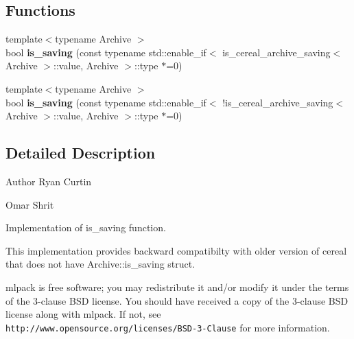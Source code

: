 \subsection*{Functions}
\begin{DoxyCompactItemize}
\item 
{\footnotesize template$<$typename Archive $>$ }\\bool \textbf{ is\+\_\+saving} (const typename std\+::enable\+\_\+if$<$ is\+\_\+cereal\+\_\+archive\+\_\+saving$<$ Archive $>$\+::value, Archive $>$\+::type $\ast$=0)
\item 
{\footnotesize template$<$typename Archive $>$ }\\bool \textbf{ is\+\_\+saving} (const typename std\+::enable\+\_\+if$<$ !is\+\_\+cereal\+\_\+archive\+\_\+saving$<$ Archive $>$\+::value, Archive $>$\+::type $\ast$=0)
\end{DoxyCompactItemize}


\subsection{Detailed Description}
\begin{DoxyAuthor}{Author}
Ryan Curtin 

Omar Shrit
\end{DoxyAuthor}
Implementation of is\+\_\+saving function.

This implementation provides backward compatibilty with older version of cereal that does not have Archive\+::is\+\_\+saving struct.

mlpack is free software; you may redistribute it and/or modify it under the terms of the 3-\/clause B\+SD license. You should have received a copy of the 3-\/clause B\+SD license along with mlpack. If not, see {\tt http\+://www.\+opensource.\+org/licenses/\+B\+S\+D-\/3-\/\+Clause} for more information. 